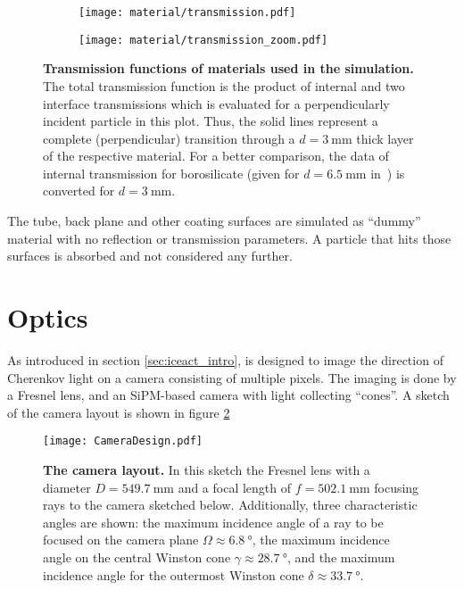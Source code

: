 \begin{figure}[H]
	\centering
	\begin{subfigure}[t]{0.485\textwidth}
		\texttt{[image: material/transmission.pdf]}
	\end{subfigure}
	\hfill
	\begin{subfigure}[t]{0.499\textwidth}
		\texttt{[image: material/transmission\_zoom.pdf]}
	\end{subfigure}
	\caption[Transmission of used materials]{\textbf{Transmission functions of materials used in the simulation.} The total transmission function is the product of internal and two interface transmissions which is evaluated for a perpendicularly incident particle in this plot. Thus, the solid lines represent a complete (perpendicular) transition through a $d=\SI{3}{\milli\meter}$ thick layer of the respective material. For a better comparison, the data of internal transmission for borosilicate (given for $d=\SI{6.5}{\milli\meter}$ in~\cite{iceact:borosilicate:datasheet}) is converted for  $d=\SI{3}{\milli\meter}$.}
	\label{iceact:model:material:transmission}	
\end{figure}

The tube, back plane and other coating surfaces are simulated as \enquote{dummy} material with no reflection or transmission parameters. A particle that hits those surfaces is absorbed and not considered any further.

\section{Optics}

As introduced in section \ref{sec:iceact_intro}, \iceact is designed to image the direction of Cherenkov light on a camera consisting of multiple pixels. The imaging is done by a Fresnel lens, and an SiPM-based camera with light collecting \enquote{cones}. A sketch of the camera layout is shown in figure \ref{iceact:camera:layout}
\begin{figure}[H]
	\centering
	\texttt{[image: CameraDesign.pdf]}
	\caption[\iceact camera layout]{\textbf{The \iceact camera layout.} \cite{iceact:camera} In this sketch the Fresnel lens with a diameter $D=\SI{549.7}{\milli\meter}$ and a focal length of $f=\SI{502.1}{\milli\meter}$ focusing rays to the camera sketched below. Additionally, three characteristic angles are shown: the maximum incidence angle of a ray to be focused on the camera plane $\Omega\approx\SI{6.8}{\degree}$, the maximum incidence angle on the central Winston cone $\gamma\approx\SI{28.7}{\degree}$, and the maximum incidence angle for the outermost Winston cone $\delta\approx\SI{33.7}{\degree}$.}
	\label{iceact:camera:layout}	
\end{figure}

